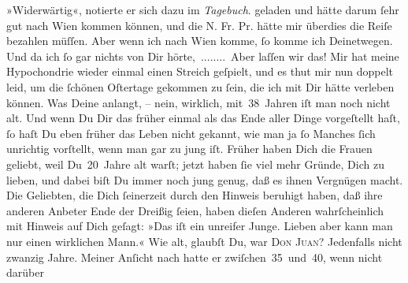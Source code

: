 \begin{ledgroupsized}[t]{13cm}
{{{                     »Widerwärtig«, notierte er sich dazu im \emph{Tagebuch}.}}}\label{K_L02911-1h} geladen und hätte darum ſehr gut nach Wien kommen können, und die N. Fr. Pr. hätte mir überdies die Reiſe bezahlen müſſen. Aber
               wenn ich nach Wien komme, ſo komme ich
               Deinetwegen. Und da ich ſo gar nichts von Dir hörte, ........ Aber laſſen wir das! Mir hat meine Hypochondrie wieder einmal \strikeout{\textcolor{gray}{×}} einen Streich geſpielt, und es thut mir nun doppelt leid, um die ſchönen
               Oſtertage gekommen zu ſein, {\pb}die ich mit Dir hätte
               verleben können.\pend
           \pstart
           Was Deine \label{K_L02911-2v}\label{K_L02911-2h} anlangt, – nein, wirklich, mit 38 Jahren iſt man noch nicht alt.
               Und wenn Du Dir das früher einmal als das Ende aller Dinge vorgeſtellt haſt, ſo haſt
               Du eben früher das Leben nicht gekannt, wie man ja ſo Manches ſich unrichtig
               vorſtellt, wenn man gar zu jung iſt. Früher haben Dich die Frauen geliebt, weil
               Du 20 Jahre alt warſt; jetzt haben ſie viel mehr Gründe, Dich zu lieben, und dabei
               biſt Du immer noch jung genug, daß es ihnen Vergnügen macht. Die Geliebten, die Dich
               ſeinerzeit durch \introOben{}den\introOben{} Hinweis  beruhigt haben, daß ihre anderen Anbeter Ende der Dreißig ſeien, haben
               dieſen Anderen wahrſcheinlich mit Hinweis auf Dich geſagt: »Das iſt {\pb}ein unreifer Junge. Lieben aber kann man nur einen
               wirklichen Mann.« Wie alt, glaubſt Du, war \textsc{Don Juan}?
               Jedenfalls nicht zwanzig Jahre. Meiner Anſicht nach hatte er zwiſchen 35 und 40, wenn
               nicht darüber{\dotsseven}\pend
           \pstart

\end{ledgroupsized}
